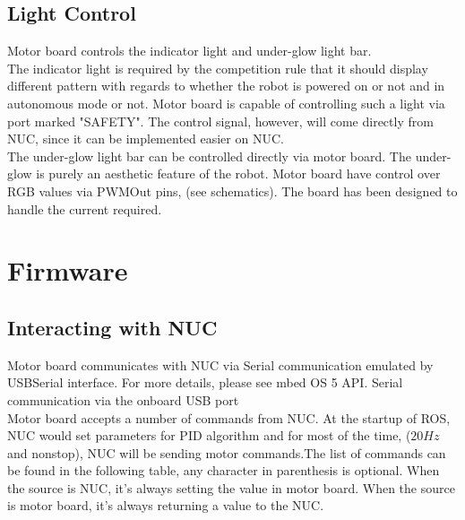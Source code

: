 \documentclass[letterpaper, 12pt]{article}
\begin{document}
\subsection{Light Control}
Motor board controls the indicator light and under-glow light bar.\\

The indicator light is required by the competition rule that it should display different pattern with regards to whether the robot is powered on or not and in autonomous mode or not. Motor board is capable of controlling such a light via port marked "SAFETY". The control signal, however, will come directly from NUC, since it can be implemented easier on NUC.\\

The under-glow light bar can be controlled directly via motor board. The under-glow is purely an aesthetic feature of the robot. Motor board have control over RGB values via PWMOut pins, (see schematics). The board has been designed to handle the current required.

\pagebreak

\section{Firmware}
\subsection{Interacting with NUC}
Motor board communicates with NUC via Serial communication emulated by USBSerial interface. For more details, please see mbed OS 5 API. Serial communication via the onboard USB port \\

Motor board accepts a number of commands from NUC. At the startup of ROS, NUC would set parameters for PID algorithm and for most of the time, ($20Hz$ and nonstop), NUC will be sending motor commands.The list of commands can be found in the following table, any character in parenthesis is optional. When the source is NUC, it's always setting the value in motor board. When the source is motor board, it's always returning a value to the NUC.\\
\end{document}
